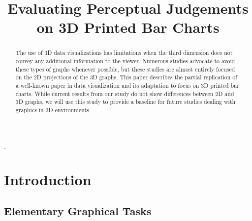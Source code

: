 \documentclass[letterpaper,inpress,dvipsnames]{jdsart}
\begin{document}
\begin{frontmatter}

\title{Evaluating Perceptual Judgements on 3D Printed Bar Charts}

\author[1]{
      }
\author[1]{
    }

\address[1]{Department of Statistics, 
  , }

\begin{abstract}
The use of 3D data visualizations has limitations when the third dimension does not convey any additional information to the viewer. Numerous studies advocate to avoid these types of graphs whenever possible, but these studies are almost entirely focused on the 2D projections of the 3D graphs. This paper describes the partial replication of a well-known paper in data visualization and its adaptation to focus on 3D printed bar charts. While current results from our study do not show differences between 2D and 3D graphs, we will use this study to provide a baseline for future studies dealing with graphics in 3D environments.
\end{abstract}

\begin{keywords}
.
\end{keywords}

\end{frontmatter}

\hypertarget{introduction}{%
\section{Introduction}\label{introduction}}

\hypertarget{elementary-graphical-tasks}{%
\subsection{Elementary Graphical Tasks}\label{elementary-graphical-tasks}}
\end{document}
